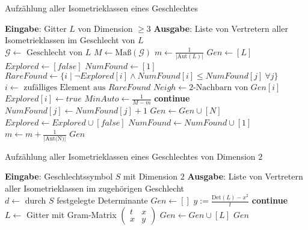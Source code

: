 \documentclass[12pt,a4paper,halfparskip,headsepline,bibtotocnumbered]{scrreprt}
\theoremstyle{nummermitklammern}
\theoremstyle{nonumberbreak}
\newcommand{\Z}{\mathbb{Z}}
\newcommand{\Det}{\text{Det}}
\newcommand{\Aut}{\text{Aut}}
\begin{document}
\begin{algorithm}[H]
	\caption{Aufzählung aller Isometrieklassen eines Geschlechtes}\label{alg:knesneigh}
	\begin{algorithmic}[1]
		\State \textbf{Eingabe}: Gitter $L$ von Dimension $\geq 3$
		\State \textbf{Ausgabe}: Liste von Vertretern aller Isometrieklassen im Geschlecht von $L$
		\\
		\State $\mathcal{G} \gets \text{ Geschlecht von } L$
		\State $M \gets \text{Maß}(\mathcal{G})$
		\State $m \gets \frac{1}{\vert \Aut (L) \vert}$
		\State $Gen \gets \left[ L\right]$
		\State $Explored \gets \left[ false \right]$
		\State $NumFound \gets \left[ 1 \right]$
			\State $RareFound \gets \lbrace i \mid \neg Explored[i] \wedge NumFound[i] \leq NumFound[j]\  \forall j\rbrace$
			\State $i \gets \text{ zufälliges Element aus } RareFound$
			\State $Neigh \gets 2\text{-Nachbarn von } Gen[i]$
			\State $Explored[i] \gets true$
				\State $MinAuto \gets \frac{1}{M-m}$
				\If {$\vert \Aut(N) \vert < MinAuto$}
					\State \textbf{continue}
				\EndIf
					\State $NumFound[j] \gets NumFound[j] + 1$
				\Else
					\State $Gen \gets Gen \cup \left[ N \right]$
					\State $Explored \gets Explored \cup \left[ false \right]$
					\State $NumFound \gets NumFound \cup \left[ 1 \right]$
					\State $m \gets m + \frac{1}{\vert \text{Aut(N)} \vert}$
				\EndIf
			\EndFor
		\EndWhile
		\State \Return $Gen$
	\end{algorithmic}
\end{algorithm}

\begin{algorithm}
	\caption{Aufzählung aller Isometrieklassen eines Geschlechtes von Dimension $2$}\label{alg:gen2dim}
	\begin{algorithmic}[1]
		\State \textbf{Eingabe}: Geschlechtssymbol $S$ mit Dimension $2$
		\State \textbf{Ausgabe}: Liste von Vertretern aller Isometrieklassen im zugehörigen Geschlecht
		\\
		\State $d \gets$ durch $S$ festgelegte Determinante
		\State $Gen \gets []$
				\State $y := \frac{\Det(L)-x^2}{t}$
				\If {$y \not \in \Z$}
					\State \textbf{continue}
				\EndIf
				\State $L \gets$ Gitter mit Gram-Matrix $\left(\begin{matrix} t & x\\x & y\end{matrix}\right)$
					\State $Gen \gets Gen \cup [L]$
				\EndIf
			\EndFor
		\EndFor
		\State \Return $Gen$
	\end{algorithmic}
\end{algorithm}
\end{document}
